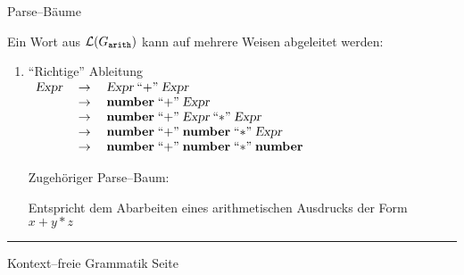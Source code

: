 \begin{slide}{}
\normalsize

\begin{center}
Parse--B\"aume
\end{center}
\vspace*{0.5cm}

\footnotesize
Ein Wort aus ${\cal L}(G_{\mathtt{arith}})$ kann auf mehrere Weisen abgeleitet werden:
\begin{enumerate}
\item ``Richtige'' Ableitung \\[0.3cm]
\hspace*{1.3cm} 
$\begin{array}{lcl}
\textsl{Expr} & \;\rightarrow\; & \textsl{Expr}\; ``\mathtt{+}\cq\; \textsl{Expr} \\
              & \;\rightarrow\; & \mathbf{number}\; ``\mathtt{+}\cq\; \textsl{Expr} \\
              & \;\rightarrow\; & \mathbf{number}\; ``\mathtt{+}\cq\; \textsl{Expr}\; ``\mathtt{*}\cq\; \textsl{Expr} \\
              & \;\rightarrow\; & \mathbf{number}\; ``\mathtt{+}\cq\; \mathbf{number}\; ``\mathtt{*}\cq\; \textsl{Expr} \\
              & \;\rightarrow\; & \mathbf{number}\; ``\mathtt{+}\cq\; \mathbf{number}\; ``\mathtt{*}\cq\; \mathbf{number} \\
\end{array}
$
\vspace*{0.5cm}

Zugeh\"origer Parse--Baum: \\[0.8cm]
\hspace*{1.3cm} 

Entspricht dem Abarbeiten eines arithmetischen Ausdrucks der Form \\[0.3cm]
\hspace*{1.3cm} $x + y * z$
\end{enumerate}


\vspace*{\fill}
\tiny \addtocounter{mypage}{1}
\rule{17cm}{1mm}
Kontext--freie Grammatik  \hspace*{\fill} Seite 
\end{slide}


